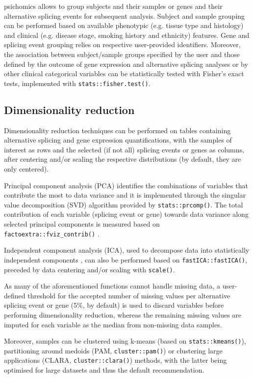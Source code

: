 psichomics allows to group subjects and their samples or genes and their alternative splicing events for subsequent analysis. Subject and sample grouping can be performed based on available phenotypic (e.g. tissue type and histology) and clinical (e.g. disease stage, smoking history and ethnicity) features. Gene and splicing event grouping relies on respective user-provided identifiers. Moreover, the association between subject/sample groups specified by the user and those defined by the outcome of gene expression and alternative splicing analyses or by other clinical categorical variables can be statistically tested with Fisher's exact tests, implemented with \texttt{stats::fisher.test()}.

\subsection{Dimensionality reduction}

Dimensionality reduction techniques can be performed on tables containing alternative splicing and gene expression quantifications, with the samples of interest as rows and the selected (if not all) splicing events or genes as columns, after centering and/or scaling the respective distributions (by default, they are only centered).

Principal component analysis (PCA) identifies the combinations of variables that contribute the most to data variance \cite{ringner:2008ve} and it is implemented through the singular value decomposition (SVD) algorithm provided by \texttt{stats::prcomp()}. The total contribution of each variable (splicing event or gene) towards data variance along selected principal components is measured based on \texttt{factoextra::fviz\_contrib()} \cite{}.

Independent component analysis (ICA), used to decompose data into statistically independent components \cite{hyvarinen:2000vk}, can also be performed based on \texttt{fastICA::fastICA()}, preceded by data centering and/or scaling with \texttt{scale()}.

As many of the aforementioned functions cannot handle missing data, a user-defined threshold for the accepted number of missing values per alternative splicing event or gene (5\%, by default) is used to discard variables before performing dimensionality reduction, whereas the remaining missing values are imputed for each variable as the median from non-missing data samples.

Moreover, samples can be clustered using k-means (based on \texttt{stats::kmeans()}), partitioning around medoids (PAM, \texttt{cluster::pam()}) or clustering large applications (CLARA, \texttt{cluster::clara()}) methods, with the latter being optimised for large datasets and thus the default recommendation.

